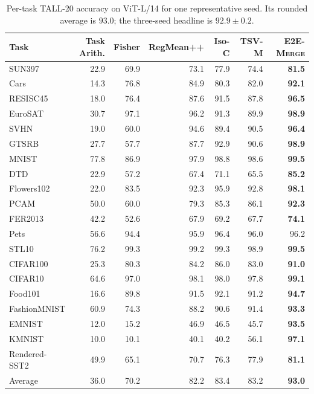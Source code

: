 \documentclass[letterpaper]{article} %
\newcommand{\method}{\textup{\textsc{E2E-Merge}}\xspace}
\theoremstyle{plain}
\theoremstyle{definition}
\begin{document}
\begin{table}[tb]
\centering
{\small
\begin{tabular*}{\textwidth}{@{\extracolsep{\fill}}lrrrrrr}
\toprule
Task & Task Arith. & Fisher & RegMean++ & Iso-C & TSV-M & \method \\
\midrule
SUN397 & 22.9 & 69.9 & 73.1 & 77.9 & 74.4 & \textbf{81.5} \\
Cars & 14.3 & 76.8 & 84.9 & 80.3 & 82.0 & \textbf{92.1} \\
RESISC45 & 18.0 & 76.4 & 87.6 & 91.5 & 87.8 & \textbf{96.5} \\
EuroSAT & 30.7 & 97.1 & 96.2 & 91.3 & 89.9 & \textbf{98.9} \\
SVHN & 19.0 & 60.0 & 94.6 & 89.4 & 90.5 & \textbf{96.4} \\
GTSRB & 27.7 & 57.7 & 87.7 & 92.9 & 90.6 & \textbf{98.9} \\
MNIST & 77.8 & 86.9 & 97.9 & 98.8 & 98.6 & \textbf{99.5} \\
DTD & 22.9 & 57.2 & 67.4 & 71.1 & 65.5 & \textbf{85.2} \\
Flowers102 & 22.0 & 83.5 & 92.3 & 95.9 & 92.8 & \textbf{98.1} \\
PCAM & 50.0 & 60.0 & 79.3 & 85.3 & 86.1 & \textbf{92.3} \\
FER2013 & 42.2 & 52.6 & 67.9 & 69.2 & 67.7 & \textbf{74.1} \\
Pets & 56.6 & 94.4 & 95.9 & 96.4 & 96.0 & 96.2 \\
STL10 & 76.2 & 99.3 & 99.2 & 99.3 & 98.9 & \textbf{99.5} \\
CIFAR100 & 25.3 & 80.3 & 84.2 & 86.0 & 83.0 & \textbf{91.0} \\
CIFAR10 & 64.6 & 97.0 & 98.1 & 98.0 & 97.8 & \textbf{99.1} \\
Food101 & 16.6 & 89.8 & 91.5 & 92.1 & 91.2 & \textbf{94.7} \\
FashionMNIST & 60.9 & 74.3 & 88.2 & 90.6 & 91.4 & \textbf{93.3} \\
EMNIST & 12.0 & 15.2 & 46.9 & 46.5 & 45.7 & \textbf{93.5} \\
KMNIST & 10.0 & 10.1 & 40.1 & 40.2 & 56.1 & \textbf{97.1} \\
Rendered-SST2 & 49.9 & 65.1 & 70.7 & 76.3 & 77.9 & \textbf{81.1} \\
\midrule
Average & 36.0 & 70.2 & 82.2 & 83.4 & 83.2 & \textbf{93.0} \\
\bottomrule
\end{tabular*}
}
\caption{Per-task TALL-20 accuracy on ViT-L/14 for one representative seed. Its rounded
average is $93.0$; the three-seed headline is $92.9\pm0.2$.}
\label{tab:tall20-full}
\end{table}
\end{document}

